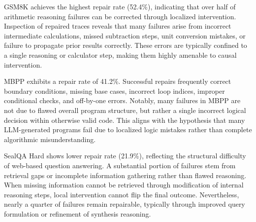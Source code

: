 \documentclass{article}
\theoremstyle{plain}
\theoremstyle{definition}
\theoremstyle{remark}
\begin{document}
\begin{table}[t]
\caption{Repair performance across benchmarks. Repair Rate is computed over failed traces only. Minimality measures position-wise token similarity between original and repaired steps (higher = smaller edits).}
\label{tab:main_results}
\centering
{}
\end{table}

GSM8K achieves the highest repair rate (52.4\%), indicating that over half of arithmetic reasoning failures can be corrected through localized intervention. Inspection of repaired traces reveals that many failures arise from incorrect intermediate calculations, missed subtraction steps, unit conversion mistakes, or failure to propagate prior results correctly. These errors are typically confined to a single reasoning or calculator step, making them highly amenable to causal intervention.

MBPP exhibits a repair rate of 41.2\%. Successful repairs frequently correct boundary conditions, missing base cases, incorrect loop indices, improper conditional checks, and off-by-one errors. Notably, many failures in MBPP are not due to flawed overall program structure, but rather a single incorrect logical decision within otherwise valid code. This aligns with the hypothesis that many LLM-generated programs fail due to localized logic mistakes rather than complete algorithmic misunderstanding.

SealQA Hard shows lower repair rate (21.9\%), reflecting the structural difficulty of web-based question answering. A substantial portion of failures stem from retrieval gaps or incomplete information gathering rather than flawed reasoning. When missing information cannot be retrieved through modification of internal reasoning steps, local intervention cannot flip the final outcome. Nevertheless, nearly a quarter of failures remain repairable, typically through improved query formulation or refinement of synthesis reasoning.
\end{document}
